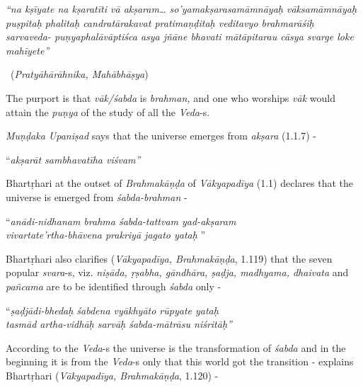\begin{myquote}
\textit{“na kṣīyate na kṣaratīti vā akṣaram… so’yamakṣarasamāmnāyaḥ vāksamāmnāyaḥ puṣpitaḥ phalitaḥ candratārakavat pratimaṇḍitaḥ veditavyo brahmarāśiḥ sarvaveda- puṇyaphalāvāptiśca asya jñāne bhavati mātāpitarau cāsya svarge loke mahīyete”} 

~\hfill (\textit{Pratyāhārāhnika, Mahābhāṣya})
\end{myquote}

The purport is that \textit{vāk/śabda} is \textit{brahman,} and one who worships \textit{vāk} would attain the \textit{puṇya} of the study of all the \textit{Veda}-s.

\textit{Muṇḍaka Upaniṣad} says that the universe emerges from \textit{akṣara} (1.1.7) -

\begin{longquote}
“\textit{akṣarāt sambhavatīha viśvam”}
\end{longquote}

Bhartṛhari at the outset of \textit{Brahmakāṇḍa} of \textit{Vākyapadīya} (1.1) declares that the universe is emerged from \textit{śabda-brahman} -

\begin{longquote}
“\textit{anādi-nidhanam brahma śabda-tattvam yad-akṣaram }\\ \textit{vivartate’rtha-bhāvena prakriyā jagato yataḥ} ”
\end{longquote}

Bhartṛhari also clarifies (\textit{Vākyapadīya, Brahmakāṇḍa}, 1.119) that the seven popular \textit{svara}-s, viz. \textit{niṣāda, ṛṣabha, gāndhāra, ṣaḍja, madhyama, dhaivata} and \textit{pañcama} are to be identified through \textit{śabda} only -

\begin{longquote}
“\textit{ṣaḍjādi-bhedaḥ śabdena vyākhyāto rūpyate yataḥ }\\ \textit{tasmād artha-vidhāḥ sarvāḥ śabda-mātrāsu niśritāḥ”} 
\end{longquote}

According to the \textit{Veda}-s the universe is the transformation of \textit{śabda} and in the beginning it is from the \textit{Veda}-s only that this world got the transition - explains Bhartṛhari (\textit{Vākyapadīya, Brahmakāṇḍa}, 1.120) -

